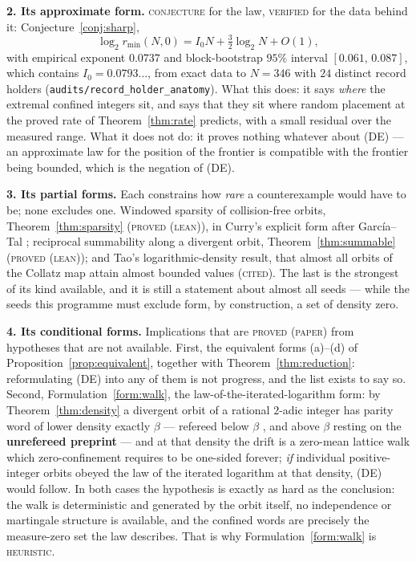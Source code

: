 \documentclass[11pt,reqno]{amsart}
\theoremstyle{plain}
\theoremstyle{definition}
\newcommand{\lab}[1]{\textnormal{\textsc{\small #1}}}
\begin{document}
\medskip
\noindent\textbf{2. Its approximate form.} \lab{conjecture} for the law,
\lab{verified} for the data behind it: Conjecture~\ref{conj:sharp},
\[
\log_2 r_{\min}(N,0)=I_0N+\tfrac32\log_2 N+O(1),
\]
with empirical exponent $0.0737$ and block-bootstrap $95\%$ interval
$[0.061,\,0.087]$, which contains $I_0=0.0793\ldots$, from exact data to $N=346$
with $24$ distinct record holders \cite{EOCDivergenceRepo}
(\texttt{audits/record\_holder\_anatomy}). What this does: it says \emph{where}
the extremal confined integers sit, and says that they sit where random placement
at the proved rate of Theorem~\ref{thm:rate} predicts, with a small residual over
the measured range. What it does not do: it proves nothing whatever about
\textup{(DE)} --- an approximate law for the position of the frontier is
compatible with the frontier being bounded, which is the negation of (DE).

\medskip
\noindent\textbf{3. Its partial forms.} Each constrains how \emph{rare} a
counterexample would have to be; none excludes one.
Windowed sparsity of collision-free orbits, Theorem~\ref{thm:sparsity}
(\lab{proved (lean)}), in Curry's explicit form \cite{Curry2026} after
Garc\'ia--Tal \cite{GarciaTal1999}; reciprocal summability along a divergent orbit,
Theorem~\ref{thm:summable} (\lab{proved (lean)}); and Tao's logarithmic-density
result, that almost all orbits of the Collatz map attain almost bounded values
\cite{Tao2022} (\lab{cited}). The last is the strongest of its kind available, and
it is still a statement about almost all seeds --- while the seeds this programme
must exclude form, by construction, a set of density zero.

\medskip
\noindent\textbf{4. Its conditional forms.} Implications that are
\lab{proved (paper)} from hypotheses that are not available.
First, the equivalent forms (a)--(d) of Proposition~\ref{prop:equivalent}, together
with Theorem~\ref{thm:reduction}: reformulating (DE) into any of them is not
progress, and the list exists to say so. Second, Formulation~\ref{form:walk}, the
law-of-the-iterated-logarithm form: by Theorem~\ref{thm:density} a divergent orbit
of a rational $2$-adic integer has parity word of lower density exactly $\beta$ ---
refereed below $\beta$ \cite{MonksYazinski2004}, and above $\beta$ resting on the
\textbf{unrefereed preprint} \cite{LopezStoll2021} --- and at that density the drift
is a zero-mean lattice walk which zero-confinement requires to be one-sided forever;
\emph{if} individual positive-integer orbits obeyed the law of the iterated
logarithm at that density, \textup{(DE)} would follow. In both cases the hypothesis is exactly as hard as the conclusion: the walk is
deterministic and generated by the orbit itself, no independence or martingale
structure is available, and the confined words are precisely the measure-zero set
the law describes. That is why Formulation~\ref{form:walk} is \lab{heuristic}.
\end{document}
